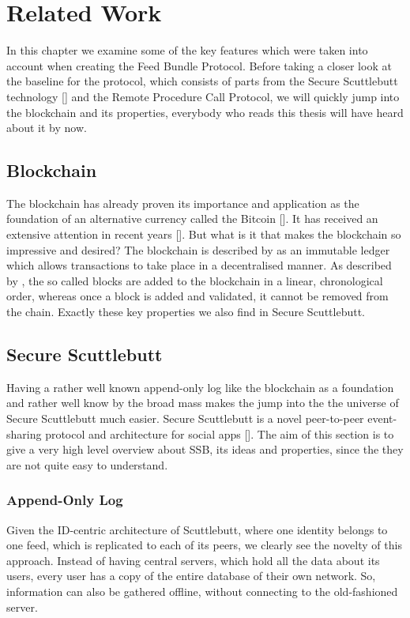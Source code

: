 \chapter{Related Work}
In this chapter we examine some of the key features which were taken into account when creating the Feed Bundle Protocol. Before taking a closer look at the baseline for the protocol, which consists of parts from the Secure Scuttlebutt technology [] and the Remote Procedure Call Protocol, we will quickly jump into the blockchain and its properties, everybody who reads this thesis will have heard about it by now.
\section{Blockchain}
The blockchain has already proven its importance and application as the foundation of an alternative currency called the Bitcoin []. It has received an extensive attention in recent years []. But what is it that makes the blockchain so impressive and desired? The blockchain is described by \citet{8029379} as an immutable ledger which allows transactions to take place in a decentralised manner. 
As described by \citet{swan2015blockchain}, the so called blocks are added to the blockchain in a linear, chronological order, whereas once a block is added and validated, it cannot be removed from the chain. Exactly these key properties we also find in Secure Scuttlebutt.
\section{Secure Scuttlebutt}
Having a rather well known append-only log like the blockchain as a foundation and rather well know by the broad mass makes the jump into the the universe of Secure Scuttlebutt much easier. Secure Scuttlebutt is a novel peer-to-peer event-sharing protocol and architecture for social apps []. The aim of this section is to give a very high level overview about SSB, its ideas and properties, since the they are not quite easy to understand.

\subsection{Append-Only Log}
Given the ID-centric architecture of Scuttlebutt, where one identity belongs to one feed, which is replicated to each of its peers, we clearly see the novelty of this approach. Instead of having central servers, which hold all the data about its users, every user has a copy of the entire database of their own network. So, information can also be gathered offline, without connecting to the old-fashioned server. 

